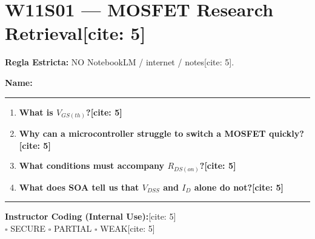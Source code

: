 \documentclass[11pt, a4paper]{article}
\begin{document}
\section*{W11S01 — MOSFET Research Retrieval[cite: 5]}
\textbf{Regla Estricta:} NO NotebookLM / internet / notes[cite: 5].

\vspace{0.5cm}
\textbf{Name:} \rule{10cm}{0.4pt}

\vspace{1cm}
\begin{enumerate}
    \item \textbf{What is $V_{GS(th)}$?[cite: 5]}
    \vspace{3cm}
    
    \item \textbf{Why can a microcontroller struggle to switch a MOSFET quickly?[cite: 5]}
    \vspace{3cm}
    
    \item \textbf{What conditions must accompany $R_{DS(on)}$?[cite: 5]}
    \vspace{3cm}
    
    \item \textbf{What does SOA tell us that $V_{DSS}$ and $I_D$ alone do not?[cite: 5]}
    \vspace{3cm}
\end{enumerate}

\vfill
\hrule
\vspace{0.3cm}
\noindent \textbf{Instructor Coding (Internal Use):}[cite: 5] \\
$\square$ SECURE \quad $\square$ PARTIAL \quad $\square$ WEAK[cite: 5]
\end{document}
